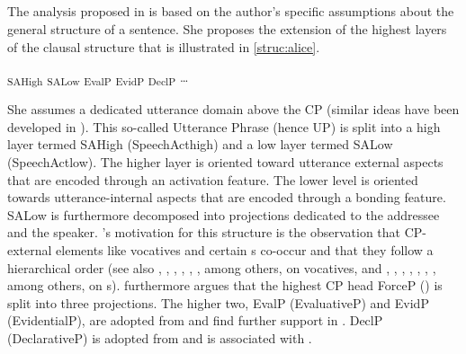 \subsection{\citet{Corr2016}}



The analysis proposed in \citet{Corr2016} is based on  the author's specific assumptions about the general structure of a sentence. She proposes the extension  of the highest layers of the clausal structure that is illustrated in \eqref{struc:alice}. 

\ea \label{struc:alice} {\ob}\textsubscript{SAHigh}  {\ob}\textsubscript{SALow}  {\ob}\textsubscript{EvalP} {\ob}\textsubscript{EvidP} {\ob}\textsubscript{DeclP} \dots {\cb}{\cb}{\cb}{\cb}{\cb}
\z 

She assumes  a dedicated utterance domain above the CP (similar ideas have been developed in   \citealt{Beninca2001, Garzonio2004, Hill2006, Hill2007b,Hill2007a, SpeasTenny2003, Speas2004, Tenny2006, Poletto2003, Zanuttini2008, Zanuttini2012, Krifka2013, Haegeman2014, Wiltschko2014}).  This so-called Utterance Phrase (hence UP) is split into a high layer termed  SAHigh (SpeechAct\-high) and a low layer termed SALow (SpeechAct\-low). The higher layer is  oriented toward utterance external aspects that are encoded through an activation feature. The lower level is  oriented towards utterance-internal aspects that are encoded through a bonding feature. SALow is furthermore decomposed into  projections dedicated to the addressee and the speaker. 
\citeauthor{Corr2016}'s motivation for this structure is  the observation that CP-external elements  like vocatives and certain s  co-occur and that  they  follow a hierarchical order (see also  \citealt{Moro2003}, \citealt{Hill2007a,Hill2013,Hill2014}, \citealt{Moreira2013}, \citealt{Espinal2013}, \citealt{Carvalho2013}, \citealt{Stavrou2013}, among others, on vocatives,  and 
\citealt{Munaro2009},   \citealt{Coniglio2010}, \citealt{Poletto2010}, \citealt{Bayer2011}, \citealt{Haegeman2014}, \citealt{Bayer2015}, \citealt{DelGobbo2015}, among others, on s). 
\citet{Corr2016} furthermore argues that the  highest CP head ForceP (\citealt{Rizzi1997}) is split into three projections. The higher two, EvalP (EvaluativeP) and EvidP (EvidentialP), are adopted from \citet{Cinque1990}  and find further support in \citet{SpeasTenny2003}. DeclP (DeclarativeP) is adopted from \citet{Ledgeway2012}  and is associated with .




